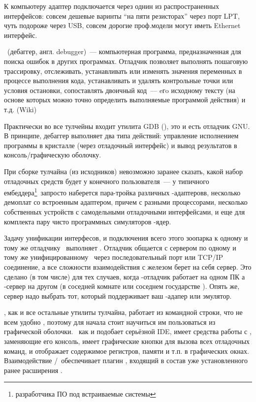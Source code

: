 К компьютеру адаптер подключается через однин из распространенных интерфейсов:
совсем дешевые варинты ``на пяти резисторах'' через порт LPT, чуть подороже
через USB, совсем дорогие проф.модели могут иметь Ethernet интерфейс.

\bigskip
{}\ (дебаггер, англ. debugger)\ --- компьютерная программа,
предназначенная для поиска ошибок в других программах. Отладчик позволяет
выполнять пошаговую трассировку, отслеживать, устанавливать или изменять
значения переменных в процессе выполнения кода, устанавливать и удалять
контрольные точки или условия остановки, сопоставлять двоичный код\ --- eгo
исходному тексту (на основе которых можно точно определить выполняемые
программой действия) и т.д. (Wiki)

Практически во все тулчейны входит утилита GDB (), это и
есть отладчик GNU. В принципе, дебаггер выполняет два типа действий:
управление исполнением программы в кристалле (через отладочный интерфейс) и
вывод результатов в консоль/графическую оболочку.

\bigskip
При сборке тулчайна (из исходников) невозможно заранее сказать, какой набор
отладочных средств будет у конечного пользователя\ --- у типичного
ембеддера\footnote{разработчика ПО под встраиваемые системы}\ запросто наберется
пара-тройка различных \jtag-адаптеровв, несколько демоплат со
встроенным адаптером, причем с разными процессорами, несколько собственных
устройств с самодельными отладочными интерфейсами, и еще для комплекта пару
чисто программных симуляторов \arm-ядер.

Задачу унификации интерфесов, и подключения всего этого зоопарка к одному и тому
же отладчику \gdb\ выполняет . Отладчик общается с сервером по
одному и тому же унифицированному \ через последовательный
порт или TCP/IP соединение, а все сложности взаимодействия с железом берет на
себя сервер.
Это сделано (в том числе) для тех случаев, когда \gdb-отладчик работает на одном
ПК а \gdb-сервер на другом (в соседней комнате или соседнем государстве
\smiley). Опять же, сервер надо выбрать тот, который поддерживает ваш
\jtag-адапер или эмулятор.

\bigskip
\gdb, как и все остальные утилиты тулчайна, работает из командной строки, что
не всем удобно \smiley, поэтому для начала стоит научиться им пользоваться из
графической оболочки. \eclipse\ как и подобает серьёзной IDE, имеет средства
работы с \gdb, заменяющие его консоль, имеет графические кнопки для вызова
всех отладочных команд, и отображает содержимое регистров, памяти и т.п. в
графических окнах. Взаимодействие \eclipse/\gdb\ обеспечивает плагин , входящий в состав уже установленного ранее
расширения .

